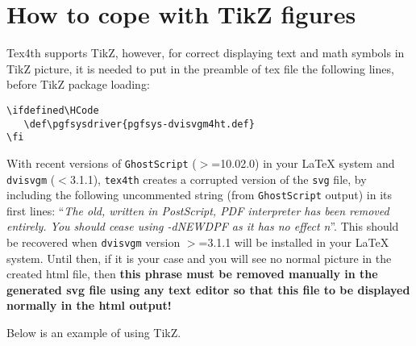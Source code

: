 \documentclass{article}
\def\pgfsysdriver{pgfsys-dvisvgm4ht.def}
\begin{document}
\section{How to cope with TikZ figures}\label{S3}
Tex4th supports TikZ, however, for correct displaying text and math symbols
in TikZ picture, it is needed to put in the preamble of tex file the
following lines, before TikZ package loading:
\begin{verbatim}
\ifdefined\HCode
   \def\pgfsysdriver{pgfsys-dvisvgm4ht.def}
\fi
\end{verbatim}

With recent versions of \texttt{GhostScript} ($>$=10.02.0) in your \LaTeX{}
system and \texttt{dvisvgm} ($<$3.1.1), \texttt{tex4th} creates a corrupted
version of the \texttt{svg} file, by including the following uncommented
string (from \texttt{GhostScript} output) in its first lines: ``\emph{The
old, written in PostScript, PDF interpreter has been removed entirely. You
should cease using -dNEWDPF as it has no effect n}''. This should be
recovered when \texttt{dvisvgm} version $>$=3.1.1 will be installed in your
\LaTeX{} system. Until then, if it is your case and you will see no normal
picture in the created html file, then \textbf{this phrase must be removed
manually in the generated svg file using any text editor so that this file to
be displayed normally in the html output!}

Below is an example of using TikZ.
\end{document}
